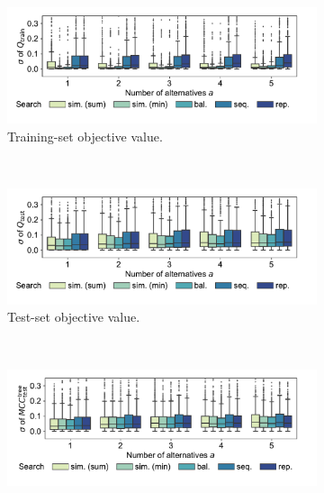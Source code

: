 \documentclass{article}
\theoremstyle{definition}
\begin{document}
\begin{figure}[p]
	\centering
	\begin{subfigure}[t]{\textwidth}
		\centering
		\includegraphics[width=\textwidth, trim=15 25 35 15, clip]{plots/afs-impact-search-stddev-train-objective.pdf}
		\caption{Training-set objective value.}
		\label{fig:afs:impact-search-stddev-train-objective}
	\end{subfigure}
	\\ \vspace{\baselineskip}
	\begin{subfigure}[t]{\textwidth}
		\centering
		\includegraphics[width=\textwidth, trim=15 25 35 15, clip]{plots/afs-impact-search-stddev-test-objective.pdf}
		\caption{Test-set objective value.}
		\label{fig:afs:impact-search-stddev-test-objective}
	\end{subfigure}
	\\ \vspace{\baselineskip}
	\begin{subfigure}[t]{\textwidth}
		\centering
		\includegraphics[width=\textwidth, trim=15 25 35 15, clip]{plots/afs-impact-search-stddev-decision-tree-test-mcc.pdf}

\end{subfigure}
\end{figure}
\end{document}
